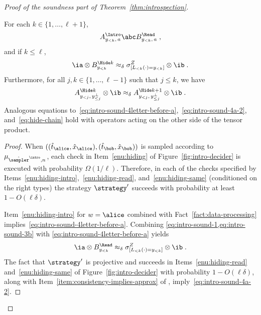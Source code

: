 \begin{proof}[Proof of the soundness part of Theorem~\ref{thm:introspection}]
  \begin{lemma}\label{lem:intro-sound-2}
    For each $k \in \{1, \ldots, \ell+1\}$,
    \begin{equation}\label{eq:intro-sound-4letter-before-a}
      \ai[y_{< k},\, a] \abc \br[y_{< k},\, a]\;,
    \end{equation}
    and if $k\leq \ell$,
    \begin{equation}\label{eq:intro-sound-4a-2}
      \ia \otimes \bhk  \approx_\delta \zLlk \otimes \ib\;.
    \end{equation}
    Furthermore, for all $j,k \in \{1,\ldots,\ell -1 \}$ such that $j \leq k$,
    we have
    \begin{equation}
      \label{eq:hide-chain}
      \ahk[y_{<j},\, y_{\leq j}^\perp] \otimes \ib \approx_\delta
      \ahp[y_{<j},\, y_{\leq j}^\perp] \otimes \ib\;.
    \end{equation}
    Analogous equations
    to~\eqref{eq:intro-sound-4letter-before-a},~\eqref{eq:intro-sound-4a-2},
    and~\eqref{eq:hide-chain} hold with operators acting on the other side of
    the tensor product.
  \end{lemma}
	
  \begin{proof}
    When $((\hat{t}_\alice,\hat{x}_\alice),(\hat{t}_\bob,\hat{x}_\bob))$ is
    sampled according to $\mu_{\tsint,n}$, each check in
    Item~\ref{enu:hiding} of Figure~\ref{fig:intro-decider} is executed with
    probability $\Omega(1/\ell)$.
    Therefore, in each of the checks specified by
    Items~\ref{enu:hiding-intro},~\ref{enu:hiding-read}, and~\ref{enu:hiding-same}
    (conditioned on the right types) the strategy
    $\strategy'$ succeeds with probability at least $1 - O(\ell \delta)$.

    Item~\ref{enu:hiding-intro} for $w=\alice$ combined with
    Fact~\ref{fact:data-processing}
    implies~\eqref{eq:intro-sound-4letter-before-a}.
    Combining \cref{eq:intro-sound-1,eq:intro-sound-3b} with
    \eqref{eq:intro-sound-4letter-before-a} yields
    \begin{equation}
      \label{eq:intro-sound-4a}
      \ia \otimes \br[y_{< k}] \approx_\delta \zLlk \otimes \ib\;.
    \end{equation}
    The fact that $\strategy'$ is projective and succeeds in
    Items~\ref{enu:hiding-read} and~\ref{enu:hiding-same} of
    Figure~\ref{fig:intro-decider} with probability $1 - O(\ell \delta)$,
    along with Item~\ref{item:consistency-implies-approx} of
    , imply~\eqref{eq:intro-sound-4a-2}.
  

\end{proof}
\end{proof}
